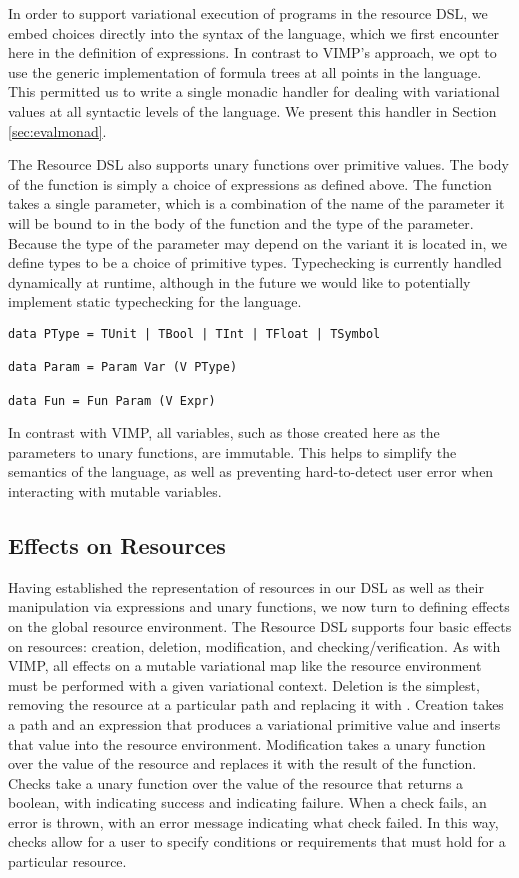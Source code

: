 \documentclass[12pt,oneside]{book}
\begin{document}
In order to support variational execution of programs in the resource DSL, we embed choices directly into the syntax of the language, which
we first encounter here in the definition of expressions. In contrast to VIMP's approach, we opt to use the generic implementation of formula
trees at all points in the language. This permitted us to write a single monadic handler for dealing with variational values at all syntactic levels
of the language. We present this handler in Section \ref{sec:evalmonad}.

The Resource DSL also supports unary functions over primitive values. The body of the function is simply a choice of expressions as defined above.
The function takes a single parameter, which is a combination of the name of the parameter it will be bound to in the body of the function and the type of the parameter. Because the
type of the parameter may depend on the variant it is located in, we define types to be a choice of primitive types. Typechecking is currently handled dynamically at runtime,
although in the future we would like to potentially implement static typechecking for the language.

\begin{lstlisting}
data PType = TUnit | TBool | TInt | TFloat | TSymbol

data Param = Param Var (V PType)

data Fun = Fun Param (V Expr)
\end{lstlisting}

In contrast with VIMP, all variables, such as those created here as the parameters to unary functions, are immutable. This helps to simplify the semantics of the language, as well as preventing
hard-to-detect user error when interacting with mutable variables.

\subsection{Effects on Resources}

Having established the representation of resources in our DSL as well as their manipulation via expressions and unary functions,
we now turn to defining effects on the global resource environment.
The Resource DSL supports four basic effects on resources: creation, deletion, modification, and checking/verification. As with VIMP,
all effects on a mutable variational map like the resource environment must be performed with a given variational context. Deletion is the
simplest, removing the resource at a particular path and replacing it with . Creation takes a path and an expression that produces a variational primitive value
and inserts that value into the resource environment. Modification takes a unary function over the value of the resource and replaces it
with the result of the function. Checks take a unary function over the value of the resource that returns a boolean, with  indicating
success and  indicating failure. When a check fails, an error is thrown, with an error message indicating what check failed.
In this way, checks allow for a user to specify conditions or requirements that must hold for a particular resource.
\end{document}
